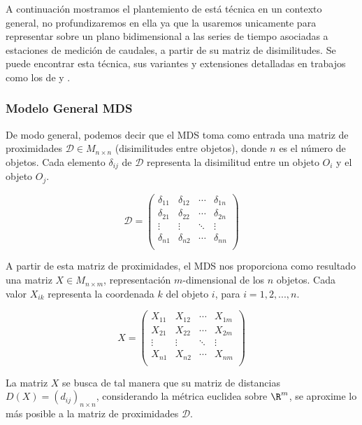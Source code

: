 \documentclass[12pt,oneside]{book}\usepackage[]{graphicx}\usepackage[]{color}
\theoremstyle{definition} %
\begin{document}
A continuación mostramos el plantemiento de está técnica en un contexto general, no profundizaremos en ella ya que la usaremos unicamente para representar sobre un plano bidimensional a las series de tiempo asociadas a estaciones de medición de caudales, a partir de su matriz de disimilitudes. Se puede encontrar esta técnica, sus variantes y extensiones detalladas en trabajos como los de \citeauthor{borg2003modern} \citeyear{borg2003modern} y \citeauthor{cox2000multidimensional} \citeyear{cox2000multidimensional}.

\subsubsection{Modelo General MDS }

De modo general, podemos decir que el MDS toma como entrada una matriz de proximidades $\mathcal{D} \in M_{n \times n}$ (disimilitudes entre objetos), donde $n$ es el número de objetos. Cada elemento $\delta_{ij}$ de $\mathcal{D}$ representa la disimilitud entre un objeto $O_i$ y el objeto $O_j$.

$$ \mathcal{D} = \begin{pmatrix}
\delta_{11} & \delta_{12} & \cdots & \delta_{1n} \\
\delta_{21} & \delta_{22} & \cdots & \delta_{2n} \\
\vdots & \vdots &  \ddots & \vdots \\
\delta_{n1} & \delta_{n2} & \cdots & \delta_{nn} \\
\end{pmatrix} $$

A partir de esta matriz de proximidades, el MDS nos proporciona como resultado una matriz $X \in M_{n \times m}$, representación $m$-dimensional de los $n$ objetos. Cada valor $X_{ik}$ representa la coordenada $k$ del objeto $i$, para $i=1,2,...,n$. 

$$ X= \begin{pmatrix}
X_{11} & X_{12} & \cdots & X_{1m} \\
X_{21} & X_{22} & \cdots & X_{2m} \\
\vdots & \vdots &  \ddots & \vdots \\
X_{n1} & X_{n2} & \cdots & X_{nm} \\
\end{pmatrix} $$


La matriz $X$ se busca de tal manera que su matriz de distancias $D(X) = (d_{ij})_{n\times n}$, considerando la métrica euclidea sobre $\R^m$, se aproxime lo más posible a la matriz de proximidades $\mathcal{D}$.
\end{document}
